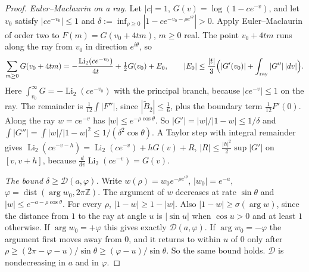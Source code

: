 \begin{proof}
\emph{Euler--Maclaurin on a ray.} Let $|c|=1$, $G(v)=\log(1-ce^{-v})$, and let $v_0$ satisfy $|ce^{-v_0}|\le1$
and $\delta:=\inf_{\rho\ge0}|1-ce^{-v_0-\rho e^{i\theta}}|>0$. Apply Euler--Maclaurin of order two to
$F(m)=G(v_0+4tm)$, $m\ge0$ real. The point $v_0+4tm$ runs along the ray from $v_0$ in direction
$e^{i\theta}$, so
\[
 \sum_{m\ge0}G(v_0+4tm)=-\frac{\operatorname{Li}_2(ce^{-v_0})}{4t}+\tfrac12G(v_0)+E_0,\qquad
 |E_0|\le\frac{|t|}3\Bigl(|G'(v_0)|+\int_{\rm ray}|G''|\,|dv|\Bigr).
\]
Here $\int_{v_0}^{\infty}G=-\operatorname{Li}_2(ce^{-v_0})$ with the principal branch, because $|ce^{-v}|\le1$
on the ray. The remainder is $\frac1{12}\int|F''|$, since $|\tilde B_2|\le\frac16$, plus the boundary term
$\frac1{12}F'(0)$. Along the ray $w=ce^{-v}$ has $|w|\le e^{-\rho\cos\theta}$. So $|G'|=|w|/|1-w|\le1/\delta$ and
$\int|G''|=\int|w|/|1-w|^2\le1/(\delta^2\cos\theta)$. A Taylor step with integral remainder gives
$\operatorname{Li}_2(ce^{-v-h})=\operatorname{Li}_2(ce^{-v})+hG(v)+R$, $|R|\le\frac{|h|^2}2\sup|G'|$ on
$[v,v+h]$, because $\frac{d}{dv}\operatorname{Li}_2(ce^{-v})=G(v)$.

\emph{The bound $\delta\ge\mathcal D(a,\varphi)$.} Write $w(\rho)=w_0e^{-\rho e^{i\theta}}$, $|w_0|=e^{-a}$,
$\varphi=\operatorname{dist}(\arg w_0,2\pi\mathbb Z)$. The argument of $w$ decreases at rate $\sin\theta$ and
$|w|\le e^{-a-\rho\cos\theta}$. For every $\rho$, $|1-w|\ge1-|w|$. Also $|1-w|\ge\sigma(\arg w)$, since the
distance from $1$ to the ray at angle $u$ is $|\sin u|$ when $\cos u>0$ and at least $1$ otherwise. If
$\arg w_0=+\varphi$ this gives exactly $\mathcal D(a,\varphi)$. If $\arg w_0=-\varphi$ the argument first
moves away from $0$, and it returns to within $u$ of $0$ only after $\rho\ge(2\pi-\varphi-u)/\sin\theta\ge
(\varphi-u)/\sin\theta$. So the same bound holds. $\mathcal D$ is nondecreasing in $a$ and in $\varphi$.


\end{proof}
